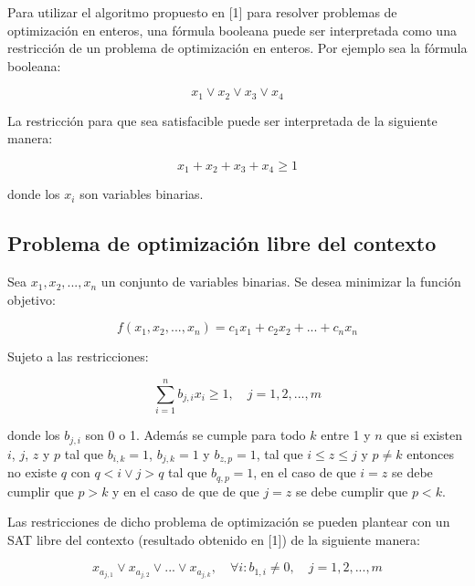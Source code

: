 \documentclass{article}
\begin{document}
Para utilizar el algoritmo propuesto en [1] para resolver problemas de optimización en enteros, una fórmula booleana puede ser interpretada como una restricción de un problema
de optimización en enteros. Por ejemplo sea la fórmula booleana:

\begin{equation}
    x_1 \lor x_2  \lor x_3 \lor x_4
\end{equation}

La restricción para que sea satisfacible puede ser interpretada de la siguiente manera:

\begin{equation}
    x_1 + x_2 + x_3 + x_4 \geq 1
\end{equation}

donde los $x_i$ son variables binarias.

\subsection*{Problema de optimización libre del contexto}

Sea $x_1, x_2, ..., x_n$ un conjunto de variables binarias. Se desea minimizar la función objetivo:

\begin{equation}
    f(x_1, x_2, ..., x_n) = c_1x_1 + c_2x_2 + ... + c_nx_n
\end{equation}

Sujeto a las restricciones:

\begin{equation}
    \sum_{i = 1}^{n} b_{j,i}x_i \geq 1, \quad j = 1, 2, ..., m
\end{equation}

donde los $b_{j,i}$ son 0 o 1. Además se cumple para todo $k$ entre 1 y $n$ que si existen $i$, $j$, $z$ y $p$ tal que $b_{i,k} = 1$, $b_{j,k} = 1$ y $b_{z,p} = 1$, tal que $i\leq z\leq j$ y $p\neq k$ entonces no existe $q$ con $q<i \lor j>q$ tal que $b_{q,p}=1$, 
en el caso de que $i=z$ se debe cumplir que $p>k$ y en el caso de que de que $j=z$ se debe cumplir que $p<k$.

Las restricciones de dicho problema de optimización se pueden plantear con un SAT libre del contexto (resultado obtenido en [1]) de la siguiente
manera:

\begin{equation}
    x_{a_{j,1}} \lor x_{a_{j,2}} \lor ... \lor x_{a_{j,k}}, \quad \forall i : b_{1,i} \neq 0, \quad j = 1, 2, ..., m
\end{equation} 
\end{document}
